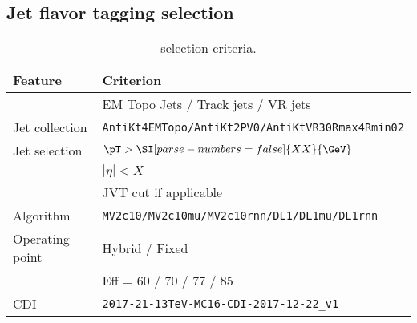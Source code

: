 \subsection{Jet flavor tagging selection}

\begin{table}[ht]
  \caption{\btag selection criteria.}%
  \label{tab:object:btag}
  \centering
  \begin{tabular}{ll}
    \toprule
    Feature & Criterion \\ 
    \midrule
    & EM Topo Jets / Track jets / VR jets \\
    \midrule
    Jet collection  & \texttt{AntiKt4EMTopo/AntiKt2PV0/AntiKtVR30Rmax4Rmin02} \\
    Jet selection   & \(\pT > \SI[parse-numbers=false]{XX}{\GeV}\) \\
    	            	& \(|\eta| < X\) \\				
                    & JVT cut if applicable \\
    \midrule
    Algorithm 		  & \texttt{MV2c10/MV2c10mu/MV2c10rnn/DL1/DL1mu/DL1rnn} \\
    \midrule
    Operating point & Hybrid /  Fixed \\
                    & Eff = 60 / 70 / 77 / 85 \\
    CDI             & \texttt{2017-21-13TeV-MC16-CDI-2017-12-22\_v1} \\
  \bottomrule
  \end{tabular}
\end{table}%
